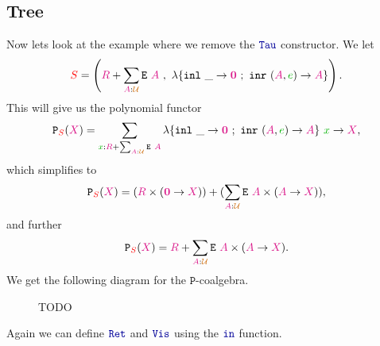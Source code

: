 \documentclass[twoside,11pt,openright]{report}
\theoremstyle{plain} %
\theoremstyle{definition}
\theoremstyle{remark}
\newcommand*{\term}[1]{\textcolor{green!70!black}{#1}} %
\newcommand*{\type}[1]{\textcolor{magenta!90!black}{#1}}
\newcommand*{\container}[1]{\textcolor{red}{#1}}
\newcommand*{\universe}[1]{\textcolor{orange!80!black}{#1}}
\newcommand*{\empt}{\type{\textbf{0}}}
\newcommand*{\function}[1]{\textcolor{blue!60!black}{\ensuremath{\mathtt{#1}}}}
\newcommand*{\typeformer}[1]{\ensuremath{\mathtt{#1}}}
\newcommand*{\functor}[1]{\ensuremath{\mathbf{\mathtt{#1}}}}
\begin{document}
\subsection{Tree}
Now lets look at the example where we remove the \(\function{Tau}\) constructor. We let
\begin{equation}
  \container{S} = \left(\type{R} + \sum_{\type{A} : \universe{\mathcal{U}}} \typeformer{E}~\type{A}~,~\lambda \{ \texttt{inl}~\_ \rightarrow \empt ~;~ \texttt{inr}~(\type{A},\term{e}) \rightarrow \type{A} \} \right).
\end{equation}
This will give us the polynomial functor
\begin{equation}
  \functor{P}_{\container{S}}(\type{X}) = \sum_{\term{x} : \type{R} + \sum_{\type{A} : \universe{\mathcal{U}}} \typeformer{E}~\type{A}} \lambda \{ \texttt{inl}~\_ \rightarrow \empt ~;~ \texttt{inr}~(\type{A},\term{e}) \rightarrow \type{A} \}~\term{x} \rightarrow \type{X},
\end{equation}
which simplifies to
\begin{equation}
  \functor{P}_{\container{S}}(\type{X}) = (\type{R} \times (\empt \rightarrow \type{X})) + (\sum_{\type{A} : \universe{\mathcal{U}}} \typeformer{E}~\type{A} \times (\type{A} \rightarrow \type{X})),
\end{equation}
and further
\begin{equation}
  \functor{P}_{\container{S}}(\type{X}) = \type{R} + \sum_{\type{A} : \universe{\mathcal{U}}} \typeformer{E}~\type{A} \times (\type{A} \rightarrow \type{X}).
\end{equation}
We get the following diagram for the \(\functor{P}\)-coalgebra.

\begin{figure}[h]
  \centering
  \caption{TODO}
\end{figure}
\noindent Again we can define \(\function{Ret}\) and \(\function{Vis}\) using the \(\function{in}\) function.
\end{document}
